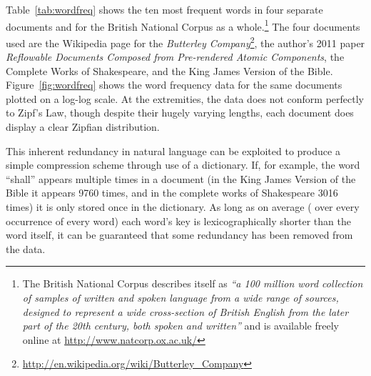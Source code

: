 Table~\ref{tab:wordfreq} shows the ten most frequent words in four separate documents and for the British National Corpus\hspace{0pt}\cite{BNCConsortium2007} as a whole.\footnote{The British National Corpus describes itself as \emph{``a 100 million word collection of samples of written and spoken language from a wide range of sources, designed to represent a wide cross-section of British English from the later part of the 20th century, both spoken and written''} and is available freely online at \url{http://www.natcorp.ox.ac.uk/}} The four documents used are the Wikipedia page for the \emph{Butterley Company}\footnote{\url{http://en.wikipedia.org/wiki/Butterley\_Company}}, the author's 2011 paper \emph{Reflowable Documents Composed from Pre-rendered Atomic Components}\hspace{0pt}\cite{Pinkney2011}, the Complete Works of Shakespeare, and the King James Version of the Bible. Figure~\ref{fig:wordfreq} shows the word frequency data for the same documents plotted on a log-log scale. At the extremities, the data does not conform perfectly to Zipf's Law, though despite their hugely varying lengths, each document does display a clear Zipfian distribution.


This inherent redundancy in natural language can be exploited to produce a simple compression scheme through use of a dictionary. If, for example, the word ``shall'' appears multiple times in a document (in the King James Version of the Bible it appears 9760 times, and in the complete works of Shakespeare 3016 times) it is only stored once in the dictionary. As long as on average (\ie{} over every occurrence of every word) each word's key is lexicographically shorter than the word itself, it can be guaranteed that some redundancy has been removed from the data.

